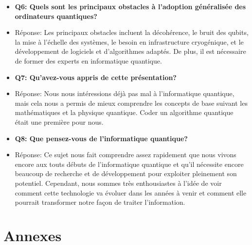 \documentclass{article}
\begin{document}
\begin{itemize}
  \item \textbf{Q6: Quels sont les principaux obstacles à l'adoption généralisée des ordinateurs quantiques?}
  \item Réponse: Les principaux obstacles incluent la décohérence, le bruit des qubits, la mise à l'échelle des systèmes, le besoin en infrastructure cryogénique, et le développement de logiciels et d'algorithmes adaptés. De plus, il est nécessaire de former des experts en informatique quantique.
  
  \item \textbf{Q7: Qu'avez-vous appris de cette présentation?}
  \item Réponse: Nous nous intéressions déjà pas mal à l'informatique quantique, mais cela nous a permis de mieux comprendre les concepts de base suivant les mathématiques et la physique quantique. Coder un algorithme quantique était une première pour nous.
  
  \item \textbf{Q8: Que pensez-vous de l'informatique quantique?}
  \item Réponse: Ce sujet nous fait comprendre assez rapidement que nous vivons encore aux touts débuts de l'informatique quantique et qu'il nécessite encore beaucoup de recherche et de développement pour exploiter pleinement son potentiel. Cependant, nous sommes très enthousiastes à l'idée de voir comment cette technologie va évoluer dans les années à venir et comment elle pourrait transformer notre façon de traiter l'information.
\end{itemize}

\break\section{Annexes}
\end{document}
